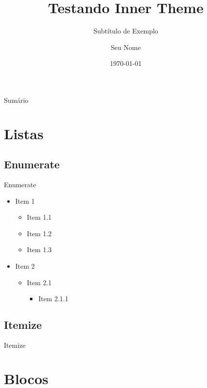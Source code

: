 \documentclass[aspect ratio = 169]{beamer}
\title{Testando Inner Theme}
\subtitle{Subtítulo de Exemplo}
\author{Seu Nome}
\institute{Sua Instituição}
\date{\today}
\begin{document}
\maketitle %

\begin{frame}{Sumário}

\tableofcontents
    
\end{frame}

\section{Listas}

\subsection{Enumerate}

\begin{frame}{Enumerate}

\begin{itemize}
    \item Item 1
    \begin{itemize}
        \item Item 1.1
        \item Item 1.2
        \item Item 1.3
    \end{itemize}
    \item Item 2
    \begin{itemize}
        \item Item 2.1
        \begin{itemize}
            \item Item 2.1.1
        \end{itemize}
    \end{itemize}
\end{itemize}
    
\end{frame}

\subsection{Itemize}

\begin{frame}{Itemize}
    
\end{frame}

\section{Blocos}
\end{document}
